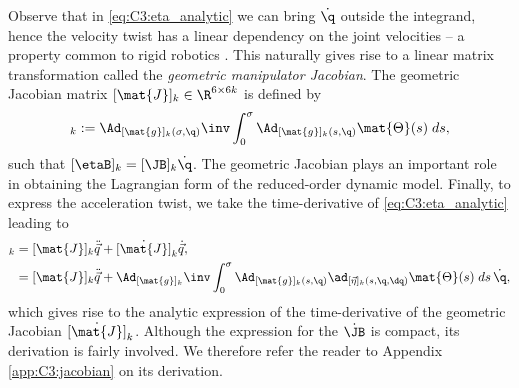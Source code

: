 %
Observe that in \eqref{eq:C3:eta_analytic} we can bring $\dot{\q}$ outside the integrand, hence the velocity twist has a linear dependency on the joint velocities -- a property common to rigid robotics \cite{Murray1994,Spong2006}. This naturally gives rise to a linear matrix transformation called the \textit{geometric manipulator Jacobian}. The geometric Jacobian matrix $[\mat{J}]_k \in \R^{6\times 6k}$ is defined by 
%
\begin{equation}
[\mat{J}]_k:= \Ad_{[\mat{g}]_k(\sigma,\q)}\inv \int_0^\sigma \Ad_{[\mat{g}]_k(s,\q)} \mat{\Theta}(s) \; ds, \label{eq:C3:jacobian_analytic}
\end{equation}
%
such that $[\etaB]_k = [\JB]_k \dot{\q}$. The geometric Jacobian plays an important role in obtaining the Lagrangian form of the reduced-order dynamic model. Finally, to express the acceleration twist, we take the time-derivative of \eqref{eq:C3:eta_analytic} leading to
%
\begin{align}
[\dot{\vec{\eta}}]_k & = [\mat{J}]_k\ddot{\vec{q}} + \dot{[\mat{J}]}_k\dot{\vec{q}}, \notag \\
& = [\mat{J}]_k\ddot{\vec{q}} + \Ad_{[\mat{g}]_k}\inv \int_0^\sigma \Ad_{[\mat{g}]_k(s,\q)} \ad_{[\vec{\eta}]_k(s,\q,\dq)} \mat{\Theta}(s) \; ds \,\dot{\q} \label{eq:C3:deta_analytic},
\end{align}
%
which gives rise to the analytic expression of the time-derivative of the geometric Jacobian $\dot{[\mat{J}]}_k$.
Although the expression for the $\dot{\JB}$ is compact, its derivation is fairly involved. We therefore refer the reader to Appendix \ref{app:C3:jacobian} on its derivation. 
